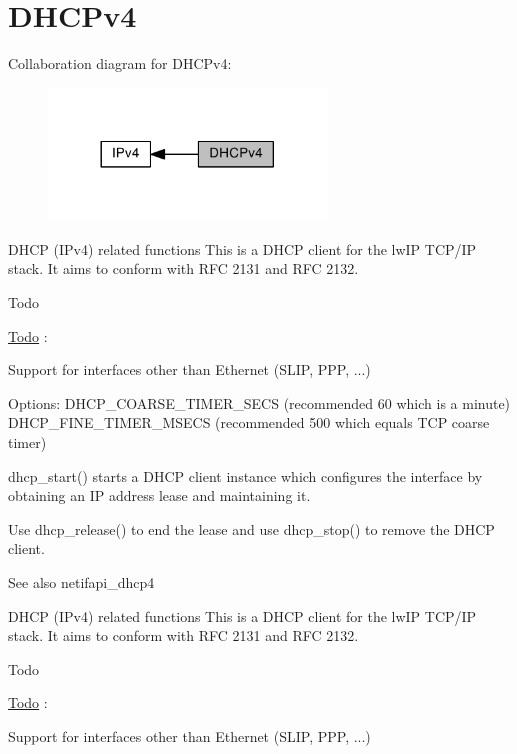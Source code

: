 \hypertarget{group__dhcp4}{}\section{D\+H\+C\+Pv4}
\label{group__dhcp4}
Collaboration diagram for D\+H\+C\+Pv4\+:
\nopagebreak
\begin{figure}[H]
\begin{center}
\leavevmode
\includegraphics[width=209pt]{group__dhcp4}
\end{center}
\end{figure}
D\+H\+CP (I\+Pv4) related functions This is a D\+H\+CP client for the lw\+IP T\+C\+P/\+IP stack. It aims to conform with R\+FC 2131 and R\+FC 2132.

\begin{DoxyRefDesc}{Todo}
\item[\hyperlink{todo__todo000009}{Todo}]\+:
\begin{DoxyItemize}
\item Support for interfaces other than Ethernet (S\+L\+IP, P\+PP, ...)
\end{DoxyItemize}\end{DoxyRefDesc}


Options\+: D\+H\+C\+P\+\_\+\+C\+O\+A\+R\+S\+E\+\_\+\+T\+I\+M\+E\+R\+\_\+\+S\+E\+CS (recommended 60 which is a minute) D\+H\+C\+P\+\_\+\+F\+I\+N\+E\+\_\+\+T\+I\+M\+E\+R\+\_\+\+M\+S\+E\+CS (recommended 500 which equals T\+CP coarse timer)

dhcp\+\_\+start() starts a D\+H\+CP client instance which configures the interface by obtaining an IP address lease and maintaining it.

Use dhcp\+\_\+release() to end the lease and use dhcp\+\_\+stop() to remove the D\+H\+CP client.

\begin{DoxySeeAlso}{See also}
netifapi\+\_\+dhcp4
\end{DoxySeeAlso}
D\+H\+CP (I\+Pv4) related functions This is a D\+H\+CP client for the lw\+IP T\+C\+P/\+IP stack. It aims to conform with R\+FC 2131 and R\+FC 2132.

\begin{DoxyRefDesc}{Todo}
\item[\hyperlink{todo__todo000020}{Todo}]\+:
\begin{DoxyItemize}
\item Support for interfaces other than Ethernet (S\+L\+IP, P\+PP, ...)
\end{DoxyItemize}\end{DoxyRefDesc}


